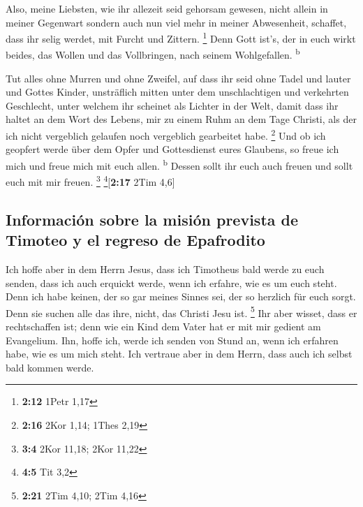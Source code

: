  Also, meine Liebsten, wie ihr allezeit seid gehorsam
gewesen, nicht allein in meiner Gegenwart sondern auch nun viel mehr in
meiner Abwesenheit, schaffet, dass ihr selig werdet, mit Furcht und
Zittern. \footnote{\textbf{2:12} 1Petr 1,17}  Denn Gott
ist's, der in euch wirkt beides, das Wollen und das Vollbringen, nach
seinem Wohlgefallen. \textsuperscript{b}

 Tut alles ohne Murren und ohne Zweifel, 
auf dass ihr seid ohne Tadel und lauter und Gottes Kinder, unsträflich
mitten unter dem unschlachtigen und verkehrten Geschlecht, unter welchem
ihr scheinet als Lichter in der Welt,  damit dass ihr
haltet an dem Wort des Lebens, mir zu einem Ruhm an dem Tage Christi,
als der ich nicht vergeblich gelaufen noch vergeblich gearbeitet habe.
\footnote{\textbf{2:16} 2Kor 1,14; 1Thes 2,19}  Und ob
ich geopfert werde über dem Opfer und Gottesdienst eures Glaubens, so
freue ich mich und freue mich mit euch allen. \textsuperscript{b}
 Dessen sollt ihr euch auch freuen und sollt euch mit mir
freuen. \footnote{\textbf{3:4} 2Kor 11,18; 2Kor 11,22}
\footnote{\textbf{4:5} Tit 3,2}{[}\textbf{2:17} 2Tim 4,6{]}

\hypertarget{informaciuxf3n-sobre-la-misiuxf3n-prevista-de-timoteo-y-el-regreso-de-epafrodito}{%
\subsection{Información sobre la misión prevista de Timoteo y el regreso
de
Epafrodito}\label{informaciuxf3n-sobre-la-misiuxf3n-prevista-de-timoteo-y-el-regreso-de-epafrodito}}

 Ich hoffe aber in dem Herrn Jesus, dass ich Timotheus
bald werde zu euch senden, dass ich auch erquickt werde, wenn ich
erfahre, wie es um euch steht.  Denn ich habe keinen, der
so gar meines Sinnes sei, der so herzlich für euch sorgt.
 Denn sie suchen alle das ihre, nicht, das Christi Jesu
ist. \footnote{\textbf{2:21} 2Tim 4,10; 2Tim 4,16}  Ihr
aber wisset, dass er rechtschaffen ist; denn wie ein Kind dem Vater hat
er mit mir gedient am Evangelium.  Ihn, hoffe ich, werde
ich senden von Stund an, wenn ich erfahren habe, wie es um mich steht.
 Ich vertraue aber in dem Herrn, dass auch ich selbst
bald kommen werde.

